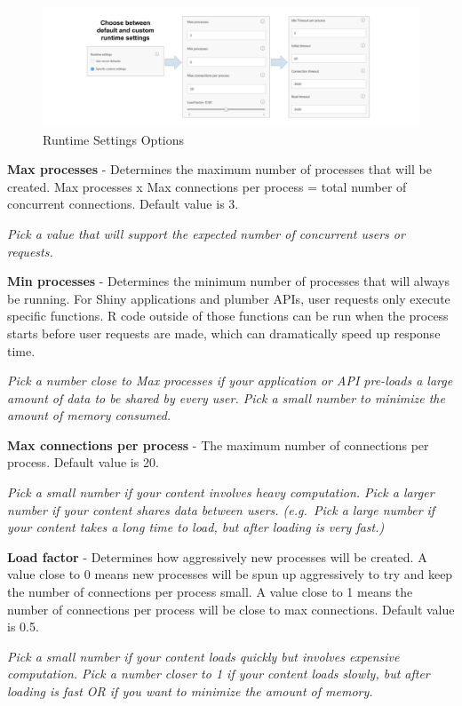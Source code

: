 \documentclass[]{book}
\theoremstyle{definition}
\theoremstyle{definition}
\theoremstyle{definition}
\theoremstyle{remark}
\begin{document}
\begin{figure}
\centering
\includegraphics{imgs/scaling/rsc-runtime.png}
\caption{Runtime Settings Options}
\end{figure}

\textbf{Max processes} - Determines the maximum number of processes that
will be created. Max processes x Max connections per process = total
number of concurrent connections. Default value is 3.

\emph{Pick a value that will support the expected number of concurrent
users or requests.}

\textbf{Min processes} - Determines the minimum number of processes that
will always be running. For Shiny applications and plumber APIs, user
requests only execute specific functions. R code outside of those
functions can be run when the process starts before user requests are
made, which can dramatically speed up response time.

\emph{Pick a number close to Max processes if your application or API
pre-loads a large amount of data to be shared by every user. Pick a
small number to minimize the amount of memory consumed.}

\textbf{Max connections per process} - The maximum number of connections
per process. Default value is 20.

\emph{Pick a small number if your content involves heavy computation.
Pick a larger number if your content shares data between users.
(e.g.~Pick a large number if your content takes a long time to load, but
after loading is very fast.)}

\textbf{Load factor} - Determines how aggressively new processes will be
created. A value close to 0 means new processes will be spun up
aggressively to try and keep the number of connections per process
small. A value close to 1 means the number of connections per process
will be close to max connections. Default value is 0.5.

\emph{Pick a small number if your content loads quickly but involves
expensive computation. Pick a number closer to 1 if your content loads
slowly, but after loading is fast OR if you want to minimize the amount
of memory.}
\end{document}

